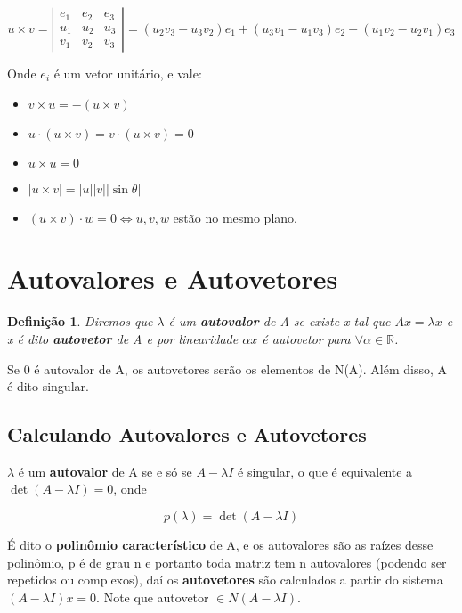 \documentclass[12pt]{article}
\newtheorem{definition}{Definição}
\begin{document}
$$u \times v = \left| \begin{array}{ccc}
    e_1 & e_2 & e_3 \\
    u_1 & u_2 & u_3 \\
    v_1 & v_2 & v_3
\end{array} \right| = (u_2 v_3 - u_3 v_2)e_1 + (u_3 v_1 - u_1 v_3)e_2 + (u_1 v_2 - u_2 v_1)e_3$$

Onde $e_i$ é um vetor unitário, e vale:

\begin{itemize}
    \item $v \times u = - (u \times v)$
    
    \item $u \cdot (u \times v) = v \cdot (u \times v) = 0$
    
    \item $u \times u = 0$
    
    \item $|u \times v| = |u||v||\sin{\theta}|$
    
    \item $(u \times v) \cdot w = 0 \Leftrightarrow u,v,w $ estão no mesmo plano.
\end{itemize}

\section*{Autovalores e Autovetores}
\label{s3}
\begin{definition}
Diremos que $\lambda$ é um \textbf{autovalor} de A se existe x tal que $Ax = \lambda x$ e x é dito \textbf{autovetor} de A e por linearidade $\alpha x$ é autovetor para $\forall \alpha \in \mathbb{R}$.
\end{definition}

Se 0 é autovalor de A, os autovetores serão os elementos de N(A). Além disso, A é dito singular.

\subsection*{Calculando Autovalores e Autovetores}
$\lambda$ é um \textbf{autovalor} de A se e só se $A - \lambda I$ é singular, o que é equivalente a $\det(A - \lambda I) = 0$, onde

$$p(\lambda) = \det(A - \lambda I)$$

É dito o \textbf{polinômio característico} de A, e os autovalores são as raízes desse polinômio, p é de grau n e portanto toda matriz tem n autovalores (podendo ser repetidos ou complexos), daí os \textbf{autovetores} são calculados a partir do sistema $(A - \lambda I)x = 0$. Note que autovetor $\in N(A - \lambda I)$.
\end{document}
